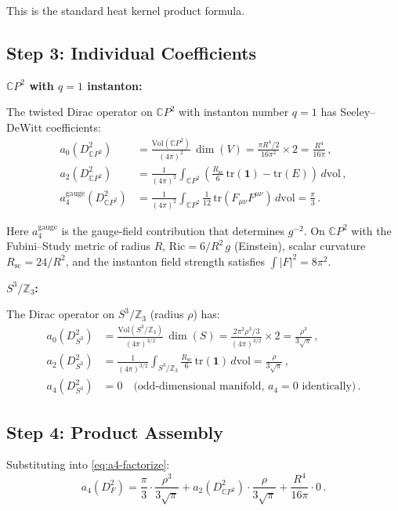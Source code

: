\documentclass[11pt,a4paper]{article}
\newcommand{\CP}{\mathbb{C}P}
\begin{document}
This is the standard heat kernel product formula.

\subsection{Step 3: Individual Coefficients}

\textbf{$\CP^2$ with $q = 1$ instanton:}

The twisted Dirac operator on $\CP^2$ with instanton number $q = 1$ has Seeley--DeWitt coefficients:
\begin{align}
a_0(D_{\CP^2}^2) &= \frac{\mathrm{Vol}(\CP^2)}{(4\pi)^2}\,\dim(V) = \frac{\pi R^4/2}{16\pi^2}\times 2 = \frac{R^4}{16\pi}\,, \\
a_2(D_{\CP^2}^2) &= \frac{1}{(4\pi)^2}\int_{\CP^2}\left(\frac{R_{\mathrm{sc}}}{6}\,\mathrm{tr}(\mathbf{1}) - \mathrm{tr}(E)\right)\,d\mathrm{vol}\,, \\
a_4^{\mathrm{gauge}}(D_{\CP^2}^2) &= \frac{1}{(4\pi)^2}\int_{\CP^2}\frac{1}{12}\,\mathrm{tr}(F_{\mu\nu}F^{\mu\nu})\,d\mathrm{vol} = \frac{\pi}{3}\,.
\end{align}

Here $a_4^{\mathrm{gauge}}$ is the gauge-field contribution that determines $g^{-2}$. On $\CP^2$ with the Fubini--Study metric of radius $R$, $\mathrm{Ric} = 6/R^2\,g$ (Einstein), scalar curvature $R_{\mathrm{sc}} = 24/R^2$, and the instanton field strength satisfies $\int |F|^2 = 8\pi^2$.

\textbf{$S^3/\mathbb{Z}_3$:}

The Dirac operator on $S^3/\mathbb{Z}_3$ (radius $\rho$) has:
\begin{align}
a_0(D_{S^3}^2) &= \frac{\mathrm{Vol}(S^3/\mathbb{Z}_3)}{(4\pi)^{3/2}}\,\dim(S) = \frac{2\pi^2\rho^3/3}{(4\pi)^{3/2}}\times 2 = \frac{\rho^3}{3\sqrt{\pi}}\,, \\
a_2(D_{S^3}^2) &= \frac{1}{(4\pi)^{3/2}}\int_{S^3/\mathbb{Z}_3}\frac{R_{\mathrm{sc}}}{6}\,\mathrm{tr}(\mathbf{1})\,d\mathrm{vol} = \frac{\rho}{3\sqrt{\pi}}\,, \\
a_4(D_{S^3}^2) &= 0 \quad\text{(odd-dimensional manifold, $a_4 = 0$ identically)}\,.
\end{align}

\subsection{Step 4: Product Assembly}

Substituting into \eqref{eq:a4-factorize}:
\begin{equation}
a_4(D_F^2) = \frac{\pi}{3}\cdot\frac{\rho^3}{3\sqrt{\pi}} + a_2(D_{\CP^2}^2)\cdot\frac{\rho}{3\sqrt{\pi}} + \frac{R^4}{16\pi}\cdot 0\,.
\end{equation}
\end{document}
